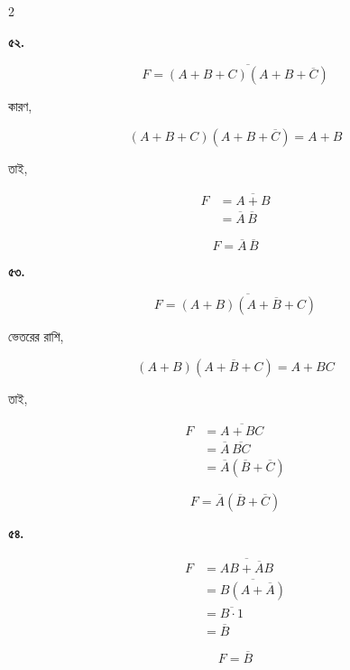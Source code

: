 \begin{multicols}{2}

\textbf{৫২.}

\[
F=
\overline{(A+B+C)(A+B+\overline C)}
\]

কারণ,

\[
(A+B+C)(A+B+\overline C)=A+B
\]

তাই,

\[
\begin{aligned}
F
&=\overline{A+B}\\
&=\overline A\,\overline B
\end{aligned}
\]

\[
\boxed{F=\overline A\,\overline B}
\]

\medskip


\textbf{৫৩.}

\[
F=
\overline{(A+B)(A+\overline B+C)}
\]

ভেতরের রাশি,

\[
(A+B)(A+\overline B+C)=A+BC
\]

তাই,

\[
\begin{aligned}
F
&=\overline{A+BC}\\
&=\overline A\,\overline{BC}\\
&=\overline A(\overline B+\overline C)
\end{aligned}
\]

\[
\boxed{F=\overline A(\overline B+\overline C)}
\]

\medskip


\textbf{৫৪.}

\[
\begin{aligned}
F
&=\overline{AB+\overline AB}\\
&=\overline{B(A+\overline A)}\\
&=\overline{B\cdot1}\\
&=\overline B
\end{aligned}
\]

\[
\boxed{F=\overline B}
\]

\medskip



\end{multicols}
